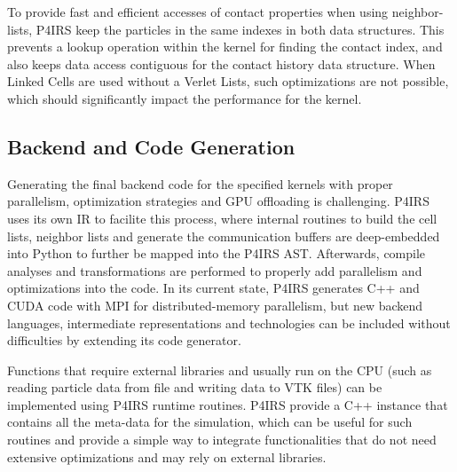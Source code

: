 \documentclass[preprint,12pt]{elsarticle}
\begin{document}
To provide fast and efficient accesses of contact properties when using neighbor-lists, P4IRS keep the particles in the same indexes in both data structures.
This prevents a lookup operation within the kernel for finding the contact index, and also keeps data access contiguous for the contact history data structure.
When Linked Cells are used without a Verlet Lists, such optimizations are not possible, which should significantly impact the performance for the kernel.


\subsection{Backend and Code Generation}
\label{sec:backend}

Generating the final backend code for the specified kernels with proper parallelism, optimization strategies and GPU offloading is challenging.
P4IRS uses its own \ac{IR} to facilite this process, where internal routines to build the cell lists, neighbor lists and generate the communication buffers are deep-embedded into Python to further be mapped into the P4IRS \ac{AST}.
Afterwards, compile analyses and transformations are performed to properly add parallelism and optimizations into the code.
In its current state, P4IRS generates C++ and CUDA code with MPI for distributed-memory parallelism, but new backend languages, intermediate representations and technologies can be included without difficulties by extending its code generator.

Functions that require external libraries and usually run on the CPU (such as reading particle data from file and writing data to VTK files) can be implemented using P4IRS runtime routines.
P4IRS provide a C++ instance that contains all the meta-data for the simulation, which can be useful for such routines and provide a simple way to integrate functionalities that do not need extensive optimizations and may rely on external libraries.
\end{document}
